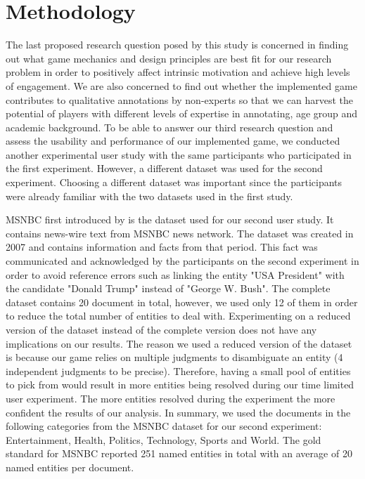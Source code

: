 \section{Methodology}
\label{game:methodology}

The last proposed research question posed by this study is concerned in finding out what game mechanics and design principles are best fit for our research problem in order to positively affect intrinsic motivation and achieve high levels of engagement. We are also concerned to find out whether the implemented game contributes to qualitative annotations by non-experts so that we can harvest the potential of players with different levels of expertise in annotating, age group and academic background. To be able to answer our third research question and assess the usability and performance of our implemented game, we conducted another experimental user study with the same participants who participated in the first experiment. However, a different dataset was used for the second experiment. Choosing a different dataset was important since the participants were already familiar with the two datasets used in the first study. 

MSNBC first introduced by \cite{24} is the dataset used for our second user study. It contains news-wire text from MSNBC news network. The dataset was created in 2007 and contains information and facts from that period. This fact was communicated and acknowledged by the participants on the second experiment in order to avoid reference errors such as linking the entity "USA President" with the candidate "Donald Trump" instead of "George W. Bush". The complete dataset contains 20 document in total, however, we used only 12 of them in order to reduce the total number of entities to deal with. Experimenting on a reduced version of the dataset instead of the complete version does not have any implications on our results. The reason we used a reduced version of the dataset is because our game relies on multiple judgments to disambiguate an entity (4 independent judgments to be precise). Therefore, having a small pool of entities to pick from would result in more entities being resolved during our time limited user experiment. The more entities resolved during the experiment the more confident the results of our analysis. In summary, we used the documents in the following categories from the MSNBC dataset for our second experiment: Entertainment, Health, Politics, Technology, Sports and World. The gold standard for MSNBC reported 251 named entities in total with an average of 20 named entities per document.   

